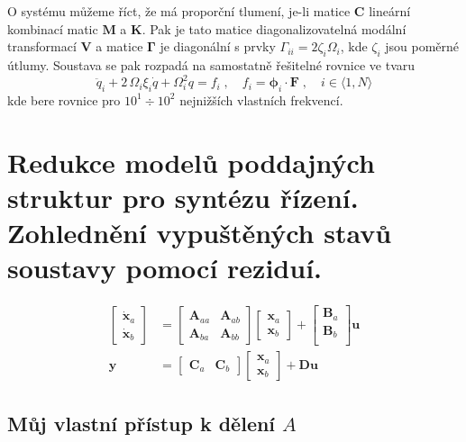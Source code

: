 \documentclass{article}
\begin{document}
	O systému můžeme říct, že má proporční tlumení, je-li matice $\bm{C}$ lineární kombinací matic $\bm{M}$ a $\bm{K}$. Pak je tato matice diagonalizovatelná modální transformací $\bm{V}$ a matice $\bm{\Gamma}$ je diagonální s prvky $\Gamma_{ii} = 2 \zeta_{i} \Omega_i$, kde $\zeta_i$ jsou poměrné útlumy. Soustava se pak rozpadá na samostatně řešitelné rovnice ve tvaru
	\begin{equation*}
		\ddot{q}_i + 2\,\Omega_i\xi_i \dot{q} + \Omega_i^2 q = f_i
		\;,\quad 
		f_i = \bm{\phi}_i \cdot \bm{F}
		\;,\quad 
		i \in \langle 1,N \rangle
	\end{equation*}
	kde bere rovnice pro $10^1 \div 10^2$ nejnižších vlastních frekvencí.

	\section{Redukce modelů poddajných struktur pro syntézu řízení. Zohlednění vypuštěných stavů soustavy pomocí reziduí.}
	\begin{align}
		\begin{bmatrix}
			\bm{\dot{x}}_a \\
			\bm{\dot{x}}_b
		\end{bmatrix}
		&=
		\begin{bmatrix}
			\bm{A}_{aa} & \bm{A}_{ab} \\
			\bm{A}_{ba} & \bm{A}_{bb}
		\end{bmatrix}
		\begin{bmatrix}
			\bm{x}_a \\
			\bm{x}_b
		\end{bmatrix}
		+
		\begin{bmatrix}
			\bm{B}_a \\
			\bm{B}_b \\
		\end{bmatrix}
		\bm{u}
		\\
		\bm{y}
		&=
		\begin{bmatrix}
			\bm{C}_a & \bm{C}_b
		\end{bmatrix}
		\begin{bmatrix}
			\bm{x}_a \\
			\bm{x}_b
		\end{bmatrix}
		+
		\bm{D}\bm{u}
	\end{align}

	\subsection*{Můj vlastní přístup k dělení $A$}
\end{document}
